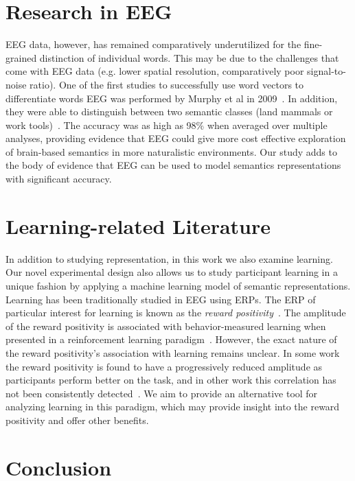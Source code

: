 \section{Research in EEG}

EEG data, however, has remained comparatively underutilized for the 
fine-grained distinction of individual words. This may be due to the challenges 
that come with EEG data (e.g. lower spatial resolution, comparatively poor 
signal-to-noise ratio).  One of the first studies to successfully use word 
vectors to differentiate words EEG was performed by Murphy et al in 
2009~\cite{Murphy2009}.  In addition, they were able to distinguish between two 
semantic classes (land mammals or work tools)~\cite{Murphy2009,Murphy2011}. The 
accuracy was as high as 98\% when averaged over multiple analyses, providing 
evidence that EEG could give more cost effective exploration of brain-based 
semantics in more naturalistic environments.  Our study adds to the body of 
evidence that EEG can be used to model semantics representations with 
significant accuracy.

\section{Learning-related Literature}

In addition to studying representation, in this work we also examine learning. 
Our novel experimental design also allows us to study participant learning in a 
unique fashion by applying a machine learning model of semantic 
representations. Learning has been traditionally studied in EEG using ERPs. The 
ERP of particular interest for learning is known as the \emph{reward 
positivity}~\cite{proudfit2015reward}. The amplitude of the reward positivity 
is associated with behavior-measured learning when presented in a reinforcement 
learning paradigm~\cite{holroyd2002neural, sutton1998reinforcement, 
williams2017application}. However, the exact nature of the reward positivity's 
association with learning remains unclear. In some work the reward positivity 
is found to have a progressively reduced amplitude as participants perform 
better on the task, and in other work this correlation has not been 
consistently detected~\cite{walsh2012learning}. We aim to provide an 
alternative tool for analyzing learning in this paradigm, which may provide 
insight into the reward positivity and offer other benefits.

\section{Conclusion}

